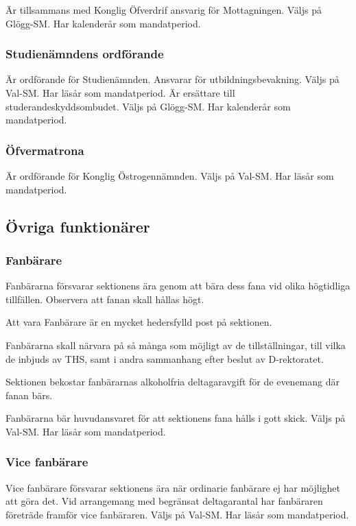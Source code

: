 \documentclass{dgovdoc}
\begin{document}
Är tillsammans med Konglig Öfverdrif ansvarig för Mottagningen.
Väljs på Glögg-SM. Har kalenderår som mandatperiod.

\subsubsection{Studienämndens ordförande}

Är ordförande för Studienämnden. Ansvarar för utbildningsbevakning. Väljs på Val-SM. Har läsår som mandatperiod. Är ersättare till studerandeskyddsombudet.
Väljs på Glögg-SM. Har kalenderår som mandatperiod.

\subsubsection{Öfvermatrona}

Är ordförande för Konglig Östrogennämnden. Väljs på Val-SM. Har läsår som
mandatperiod.

\subsection{Övriga funktionärer}

\subsubsection{Fanbärare}

Fanbärarna försvarar sektionens ära genom att bära dess fana vid olika högtidliga tillfällen. Observera att fanan skall hållas högt.

Att vara Fanbärare är en mycket hedersfylld post på sektionen.

Fanbärarna skall närvara på så många som möjligt av de tillställningar, till vilka de inbjuds av THS, samt i andra sammanhang efter beslut av D-rektoratet.

Sektionen bekostar fanbärarnas alkoholfria deltagaravgift för de evenemang där fanan bärs.

Fanbärarna bär huvudansvaret för att sektionens fana hålls i gott skick. Väljs på Val-SM. Har läsår som mandatperiod.

\subsubsection{Vice fanbärare}

Vice fanbärare försvarar sektionens ära när ordinarie fanbärare ej har möjlighet att göra det. Vid arrangemang med begränsat deltagarantal har fanbäraren företräde framför vice fanbäraren. Väljs på Val-SM. Har läsår som mandatperiod.
\end{document}
